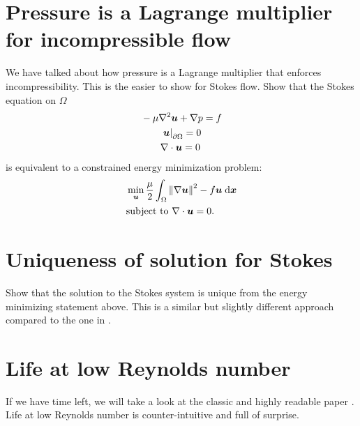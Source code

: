 \documentclass[11pt,letterpaper]{article}
\begin{document}
\section{Pressure is a Lagrange multiplier for incompressible flow}
We have talked about how pressure is a Lagrange multiplier that enforces incompressibility. This is the easier to show for Stokes flow. Show that the Stokes equation on $\Omega$
\begin{align}
    &-\mu\nabla^2 \boldsymbol{u} + \nabla p = f\\
    &\qquad \left.\boldsymbol{u}\right|_{\partial\Omega} = 0\\
    &\qquad\nabla\cdot \boldsymbol{u} = 0
\end{align}
is equivalent to a constrained energy minimization problem:
\begin{align}
    &\min_{\boldsymbol{u}} \frac{\mu}{2}\int_\Omega \left\Vert \nabla\boldsymbol{u} \right\Vert^2-f\boldsymbol{u}\;\mathrm{d} \boldsymbol{x}\\
    &\text{subject to }\nabla\cdot \boldsymbol{u} = 0.
\end{align}

\section{Uniqueness of solution for Stokes}
Show that the solution to the Stokes system is unique from the energy minimizing statement above. This is a similar but slightly different approach compared to the one in \cite[\S 7.4]{Acheson_90}. 

\section{Life at low Reynolds number}
If we have time left, we will take a look at the classic and highly readable paper \cite{Purcell_77}. Life at low Reynolds number is counter-intuitive and full of surprise.


\vfill
\printbibliography
\end{document}
